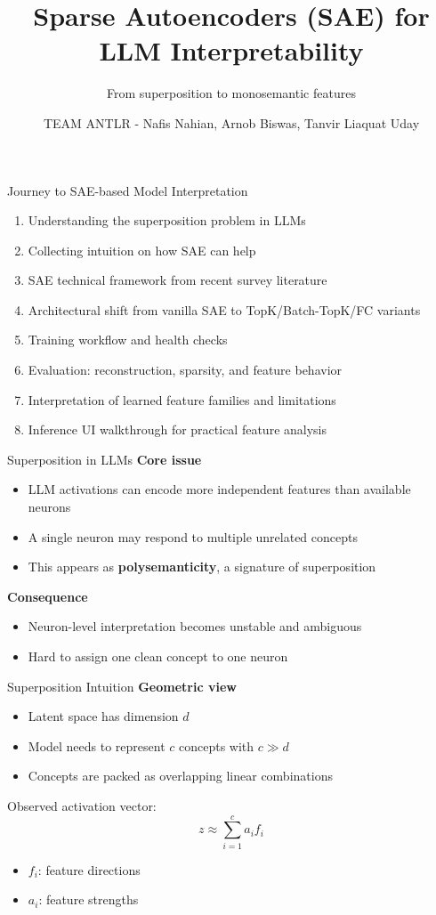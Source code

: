 \documentclass[aspectratio=169,12pt]{beamer}
\title{Sparse Autoencoders (SAE) for LLM Interpretability}
\subtitle{From superposition to monosemantic features}
\author{TEAM ANTLR - Nafis Nahian, Arnob Biswas, Tanvir Liaquat Uday}
\date{}
\begin{document}
\begin{frame}
  \titlepage
\end{frame}

\begin{frame}{Journey to SAE-based Model Interpretation}
\begin{enumerate}
  \item Understanding the superposition problem in LLMs
  \item Collecting intuition on how SAE can help
  \item SAE technical framework from recent survey literature
  \item Architectural shift from vanilla SAE to TopK/Batch-TopK/FC variants
  \item Training workflow and health checks
  \item Evaluation: reconstruction, sparsity, and feature behavior
  \item Interpretation of learned feature families and limitations
  \item Inference UI walkthrough for practical feature analysis
\end{enumerate}
\end{frame}

\begin{frame}{Superposition in LLMs}
\textbf{Core issue}
\begin{itemize}
  \item LLM activations can encode more independent features than available neurons
  \item A single neuron may respond to multiple unrelated concepts
  \item This appears as \textbf{polysemanticity}, a signature of superposition
\end{itemize}

\vspace{0.4em}
\textbf{Consequence}
\begin{itemize}
  \item Neuron-level interpretation becomes unstable and ambiguous
  \item Hard to assign one clean concept to one neuron
\end{itemize}
\end{frame}

\begin{frame}{Superposition Intuition}
\textbf{Geometric view}
\begin{itemize}
  \item Latent space has dimension $d$
  \item Model needs to represent $c$ concepts with $c \gg d$
  \item Concepts are packed as overlapping linear combinations
\end{itemize}

Observed activation vector:
\[
z \approx \sum_{i=1}^{c} a_i f_i
\]
\begin{itemize}
  \item $f_i$: feature directions
  \item $a_i$: feature strengths
\end{itemize}
\end{frame}
\end{document}
